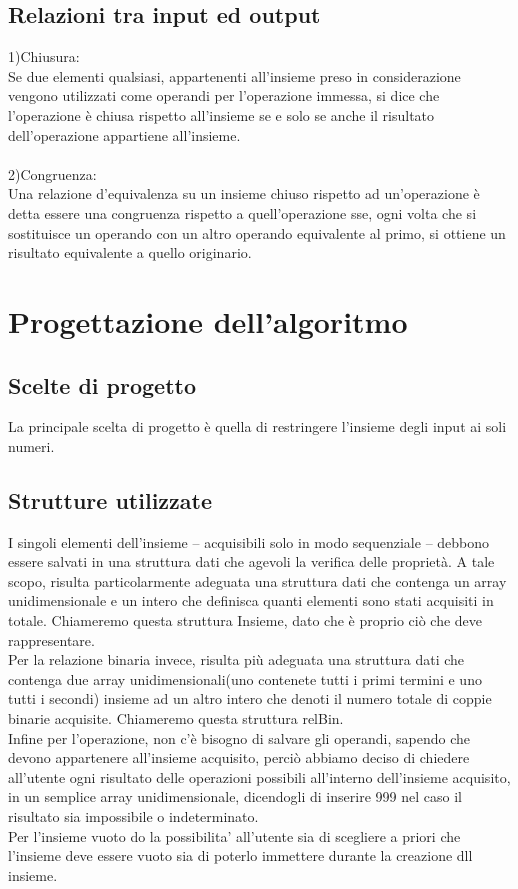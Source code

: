 \documentclass[11pt,a4paper,titlepage,block]{article}
\begin{document}
	\subsection{Relazioni tra input ed output}
	1)Chiusura:\\
	Se due elementi qualsiasi, appartenenti all'insieme preso in considerazione vengono utilizzati come operandi per l'operazione immessa, si dice che l'operazione è chiusa rispetto all'insieme se e solo se anche il risultato dell'operazione appartiene all'insieme.
	\\
	\\
	2)Congruenza:\\Una relazione d'equivalenza su un insieme chiuso rispetto ad un'operazione è detta essere una congruenza
	rispetto a quell'operazione sse, ogni volta che si sostituisce un operando con un altro operando
	equivalente al primo, si ottiene un risultato equivalente a quello originario.
	\newpage
	\section{Progettazione dell'algoritmo}
	\subsection{Scelte di progetto}
	La principale scelta di progetto è quella di restringere l'insieme degli input ai soli numeri.
	\subsection{Strutture utilizzate}
	I singoli elementi dell'insieme – acquisibili solo in modo sequenziale – debbono essere salvati in una struttura
	dati che agevoli la verifica delle proprietà.  A tale scopo, risulta particolarmente
	adeguata una struttura dati che contenga un array unidimensionale e un intero che definisca quanti elementi sono stati acquisiti in totale. Chiameremo questa struttura Insieme, dato che è proprio ciò che deve rappresentare.
	\\
	Per la relazione binaria invece, risulta più adeguata una struttura dati che contenga due array unidimensionali(uno contenete tutti i primi termini e uno tutti i secondi) insieme ad un altro intero che denoti il numero totale di coppie binarie acquisite. Chiameremo questa struttura relBin.
	\\
	Infine per l'operazione, non c'è bisogno di salvare gli operandi, sapendo che devono appartenere all'insieme acquisito, perciò abbiamo deciso di chiedere all'utente ogni risultato delle operazioni possibili all'interno dell'insieme acquisito, in un semplice array unidimensionale, dicendogli di inserire 999 nel caso il risultato sia impossibile o indeterminato.
	\\
	Per l'insieme vuoto do la possibilita' all'utente sia di scegliere a priori che l'insieme deve essere vuoto sia di poterlo immettere durante la creazione dll insieme.
\end{document}
